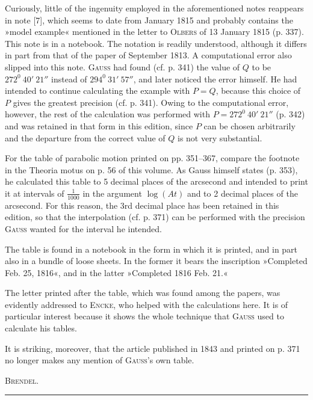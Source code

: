 \par
\noindent\hspace*{\parindent}Curiously, little of the ingenuity employed in the aforementioned notes reappears in note [7], which seems to date from January 1815 and probably contains the »model example« mentioned in the letter to \textsc{Olbers} of 13 January 1815 (p. 337). This note is in a notebook. The notation is readily understood, although it differs in part from that of the paper of September 1813. A computational error also slipped into this note. \textsc{Gauss} had found (cf. p. 341) the value of \(Q\) to be \(272^0\ 40'\ 21''\) instead of \(294^0\ 31'\ 57''\), and later noticed the error himself. He had intended to continue calculating the example with \(P=Q\), because this choice of \(P\) gives the greatest precision (cf. p. 341). Owing to the computational error, however, the rest of the calculation was performed with \(P=272^0\ 40'\ 21''\) (p. 342) and was retained in that form in this edition, since \(P\) can be chosen arbitrarily and the departure from the correct value of \(Q\) is not very substantial.
\par
\noindent\hspace*{\parindent}For the table of parabolic motion printed on pp. 351–367, compare the footnote in the Theoria motus on p. 56 of this volume. As Gauss himself states (p. 353), he calculated this table to 5 decimal places of the arcsecond and intended to print it at intervals of \(\frac1{1000}\) in the argument \(\log(At)\) and to 2 decimal places of the arcsecond. For this reason, the 3rd decimal place has been retained in this edition, so that the interpolation (cf. p. 371) can be performed with the precision \textsc{Gauss} wanted for the interval he intended.
\par
\noindent\hspace*{\parindent}The table is found in a notebook in the form in which it is printed, and in part also in a bundle of loose sheets. In the former it bears the inscription »Completed Feb. 25, 1816«, and in the latter »Completed 1816 Feb. 21.«
\par
\noindent\hspace*{\parindent}The letter printed after the table, which was found among the papers, was evidently addressed to \textsc{Encke}, who helped with the calculations here. It is of particular interest because it shows the whole technique that \textsc{Gauss} used to calculate his tables.
\par
\noindent\hspace*{\parindent}It is striking, moreover, that the article published in 1843 and printed on p. 371 no longer makes any mention of \textsc{Gauss}'s own table.
\par\smallskip
\hfill\textsc{Brendel}.
\par\endgroup\bigskip
\begin{center}\rule{.27\linewidth}{.4pt}\end{center}
